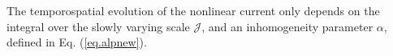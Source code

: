 %
%
The temporospatial evolution of the nonlinear current only depends on the integral over the slowly varying scale $\mathcal{J}$, and an inhomogeneity parameter $\alpha$, defined in Eq. (\ref{eq.alpnew}). 
